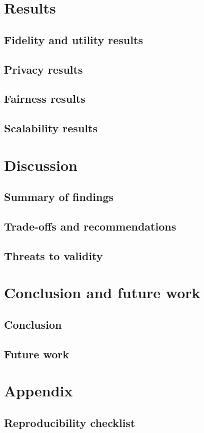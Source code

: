 \documentclass{article}
\begin{document}
\section{Results}

\subsection{Fidelity and utility results}

\subsection{Privacy results}

\subsection{Fairness results}

\subsection{Scalability results}

\section{Discussion}

\subsection{Summary of findings}

\subsection{Trade-offs and recommendations}

\subsection{Threats to validity}

\section{Conclusion and future work}

\subsection{Conclusion}

\subsection{Future work}

\appendix
\section{Appendix}
\subsection{Reproducibility checklist}

\printbibliography
\end{document}
